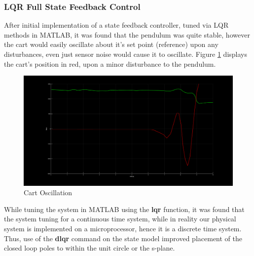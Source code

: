 \documentclass[12pt]{article}
\begin{document}
\subsubsection{LQR Full State Feedback Control}
After initial implementation of a state feedback controller, tuned via LQR methods in MATLAB, it was found that the pendulum was quite stable, however the cart would easily oscillate about it's set point (reference) upon any disturbances, even just sensor noise would cause it to oscillate. Figure \ref{fig:osc} displays the cart's position in red, upon a minor disturbance to the pendulum.
\begin{figure}[H]
    \centering
    \includegraphics[width=.6\linewidth]{figures/posOsc2withDotStates.png}
    \caption{Cart Oscillation}
    \label{fig:osc}
\end{figure}
While tuning the system in MATLAB using the \textbf{lqr} function, it was found that the system tuning for a continuous time system, while in reality our physical system is implemented on a microprocessor, hence it is a discrete time system. Thus, use of the \textbf{dlqr} command on the state model improved placement of the closed loop poles to within the unit circle or the s-plane.
\end{document}
